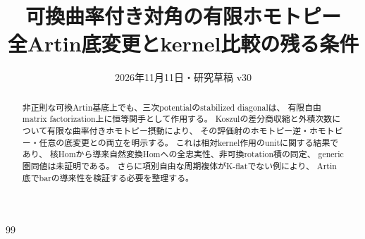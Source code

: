 
\title{可換曲率付き対角の有限ホモトピー\\\large 全Artin底変更とkernel比較の残る条件}
\author{}
\date{2026年11月11日・研究草稿 v30}

\maketitle
\begin{abstract}
非正則な可換Artin基底上でも、三次potentialのstabilized diagonalは、
有限自由matrix factorization上に恒等関手として作用する。
Koszulの差分商収縮と外積次数について有限な曲率付きホモトピー摂動により、
その評価射のホモトピー逆・ホモトピー・任意の底変更との両立を明示する。
これは相対kernel作用のunitに関する結果であり、
核Homから導来自然変換Homへの全忠実性、非可換rotation積の同定、
generic圏同値は未証明である。
さらに項別自由な周期複体がK-flatでない例により、
Artin底でbarの導来性を検証する必要を整理する。
\end{abstract}

\begin{thebibliography}{99}

\end{thebibliography}

